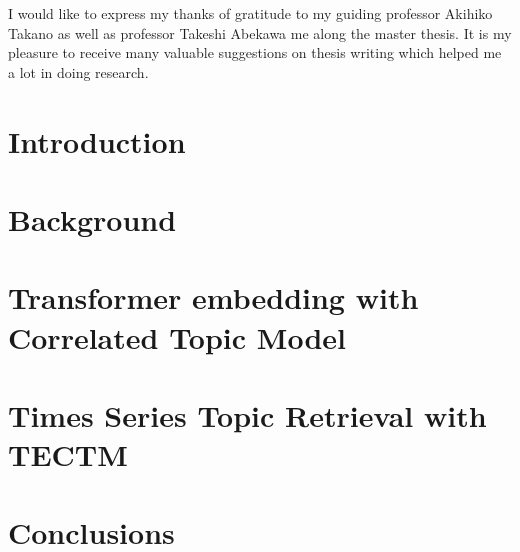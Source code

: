 \documentclass[master,final,11pt]{iscs-thesis}
\date{\today}
\begin{document}
\begin{eabstract}

\end{eabstract}
\maketitle
\begin{acknowledge}
I would like to express my thanks of gratitude to my guiding professor Akihiko Takano as well as professor Takeshi Abekawa me along the master thesis. It is my pleasure to receive many valuable suggestions on thesis writing which helped me a lot in doing research.
\end{acknowledge}
\frontmatter
\tableofcontents
\listoffigures
\listoftables
\listofalgorithms
\mainmatter %
\titlepage
\chapter{Introduction}\label{ch1}



\chapter{Background}\label{ch2}

%
%
%
\chapter{Transformer embedding with Correlated Topic Model}\label{ch4}



\chapter{Times Series Topic Retrieval with TECTM}\label{ch5}



\chapter{Conclusions}\label{ch6}

%


%
\end{document}
